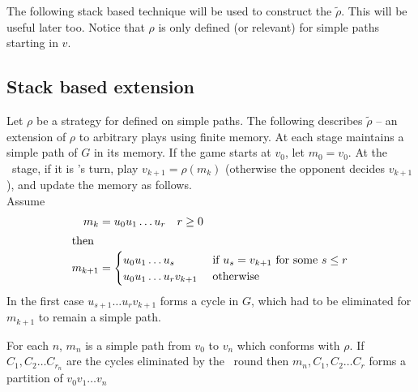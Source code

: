 The following stack based technique will be used to construct the $\tilde{\rho}$. This will be useful later too. Notice that $\rho$ is only defined (or relevant) for simple paths starting in $v$.

\subsection{Stack based extension} 
\label{sec:stack}
Let $\rho$ be a strategy for  defined on simple paths. The following describes $ \tilde{\rho}$ -- an extension of $\rho$ to arbitrary plays using finite memory. At each stage  maintains a simple path of $G$ in its memory. If the game starts at $v_0$, let $m_0=v_0$. At the \nth[k+1]\ stage, if it is 's turn, play $v_{k+1}=\rho(m_k)$ (otherwise the opponent decides $v_{k+1}$), and update the memory as follows.\\
Assume
\begin{align*}
    m_k &=u_0 u_1 \ldots u_r \quad r \geq 0\\
    \intertext{then}
    m_{k+1}&=\begin{cases}
        u_0 u_1 \ldots u_s & \text{ if } u_s = v_{k+1} \text{ for some } s \leq r \\
        u_0  u_1 \ldots u_r v_{k+1} & \text{ otherwise }
        \end{cases}
\end{align*}
In the first case $u_{s+1} \ldots u_r v_{k+1}$ forms a cycle in $G$, which had to be eliminated for $m_{k+1}$ to remain a simple path.

For each $n$, $m_n$ is a simple path from $v_0$ to $v_n$ which conforms with $\rho$. If $C_1,C_2 \ldots C_{r_n}$ are the cycles eliminated by the \nth\ round then $m_n, C_1, C_2 \ldots C_r$ forms a partition of $v_0v_1 \ldots v_n$


